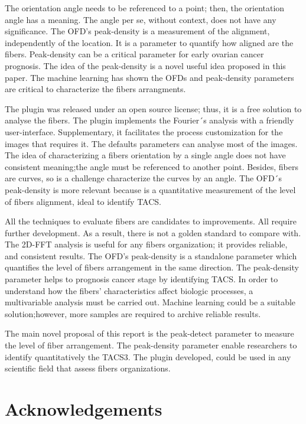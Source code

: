 \documentclass[12pt,a4paper]{article}
\begin{document}
The orientation angle needs to be referenced to a point; then, the orientation angle has a meaning. The angle per se, without context, does not have any significance. The OFD's peak-density is a measurement of the alignment, independently of the location. It is a parameter to quantify how aligned are the fibers. Peak-density can be a critical parameter for early ovarian cancer prognosis. The idea of the peak-density is a novel useful idea proposed in this paper. The machine learning has shown the OFDs and peak-density parameters are critical to characterize the fibers arrangments.

The plugin was released under an open source license; thus, it is a free solution to analyse the fibers. The plugin implements the Fourier´s analysis with a friendly user-interface. Supplementary, it facilitates the process customization for the images that requires it. The defaults parameters can analyse most of the images. The idea of characterizing a fibers orientation by a single angle does not have consistent meaning;the angle must be referenced to another point. Besides, fibers are curves, so is a challenge characterize the curves by an angle. The OFD´s peak-density is more relevant because is a quantitative measurement of the level of fibers alignment, ideal to identify TACS.

All the techniques to evaluate fibers are candidates to improvements. All require further development. As a result, there is not a golden standard to compare with. The 2D-FFT analysis is useful for any fibers organization; it provides reliable, and consistent results. The OFD's peak-density is a standalone parameter which quantifies the level of fibers arrangement in the same direction.  The peak-density parameter helps to prognosis cancer stage by identifying TACS. In order to understand how the fibers' characteristics affect biologic processes, a multivariable analysis must be carried out. Machine learning could be a suitable solution;however, more samples are required to archive reliable results.

The main novel proposal of this report is the peak-detect parameter to measure the level of fiber arrangement. The peak-density parameter enable researchers to identify quantitatively the TACS3. The plugin developed, could be used in any scientific field that assess fibers organizations.

\section{Acknowledgements}
\end{document}
